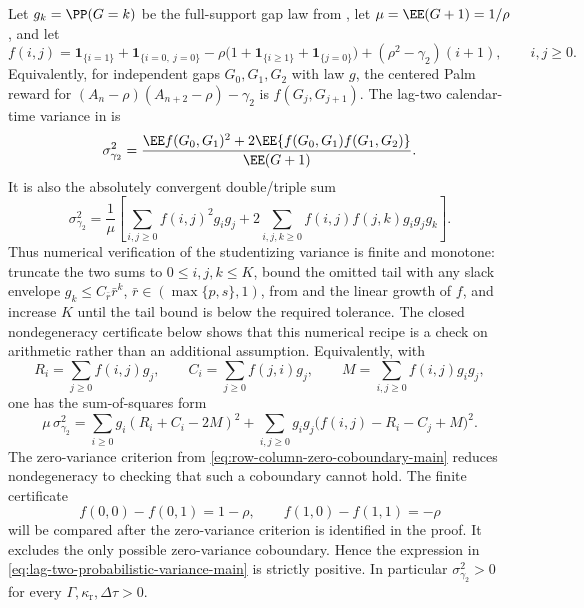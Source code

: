 \begin{lemma}\label{lem:lag-two-variance-nondegenerate-main}
Let \(g_k=\PP(G=k)\) be the full-support gap law from
, let \(\mu=\EE(G+1)=1/\rho\), and let
\[
f(i,j)=
\mathbf1_{\{i=1\}}+\mathbf1_{\{i=0,\ j=0\}}
-\rho\bigl(1+\mathbf1_{\{i\ge1\}}+\mathbf1_{\{j=0\}}\bigr)
+(\rho^2-\gamma_2)(i+1),
\qquad i,j\ge0 .
\]
Equivalently, for independent gaps \(G_0,G_1,G_2\) with law \(g\),
the centered Palm reward for
\((A_n-\rho)(A_{n+2}-\rho)-\gamma_2\) is \(f(G_j,G_{j+1})\).  The
lag-two calendar-time variance in
 is
\begin{equation}\label{eq:lag-two-probabilistic-variance-main}
\sigma_{\gamma_2}^2
=\frac{
\EE f(G_0,G_1)^2
+2\EE\{f(G_0,G_1)f(G_1,G_2)\}}
{\EE(G+1)} .
\end{equation}
It is also the absolutely convergent double/triple sum
\begin{equation}\label{eq:lag-two-explicit-variance-main}
\sigma_{\gamma_2}^2
=\frac1{\mu}\left[
\sum_{i,j\ge0}f(i,j)^2g_ig_j
+2\sum_{i,j,k\ge0}f(i,j)f(j,k)g_ig_jg_k
\right].
\end{equation}
Thus numerical verification of the studentizing variance is finite and
monotone: truncate the two sums to \(0\le i,j,k\le K\), bound the omitted tail
with any slack envelope \(g_k\le C_{\bar r}\bar r^k\),
\(\bar r\in(\max\{p,s\},1)\), from
 and the linear growth of
\(f\), and increase \(K\) until the tail bound is below the required tolerance.  The
closed nondegeneracy certificate below shows that this numerical recipe is a
check on arithmetic rather than an additional assumption.
Equivalently, with
\[
R_i=\sum_{j\ge0}f(i,j)g_j,\qquad
C_i=\sum_{j\ge0}f(j,i)g_j,\qquad
M=\sum_{i,j\ge0}f(i,j)g_ig_j,
\]
one has the sum-of-squares form
\begin{equation}\label{eq:lag-two-variance-squares-main}
\mu\,\sigma_{\gamma_2}^2
=\sum_{i\ge0}g_i(R_i+C_i-2M)^2
+\sum_{i,j\ge0}g_ig_j\bigl(f(i,j)-R_i-C_j+M\bigr)^2 .
\end{equation}
The zero-variance criterion from \eqref{eq:row-column-zero-coboundary-main}
reduces nondegeneracy to checking that such a coboundary cannot hold.  The
finite certificate
\begin{equation}\label{eq:lag-two-finite-nondegeneracy-certificate-main}
f(0,0)-f(0,1)=1-\rho,\qquad
f(1,0)-f(1,1)=-\rho
\end{equation}
will be compared after the zero-variance criterion is identified in the proof.
It excludes the only possible zero-variance coboundary.  Hence
the expression in \eqref{eq:lag-two-probabilistic-variance-main} is strictly
positive.
In particular \(\sigma_{\gamma_2}^2>0\) for every
\(\Gamma,\kappa_{\mathrm r},\Delta\tau>0\).
\end{lemma}

